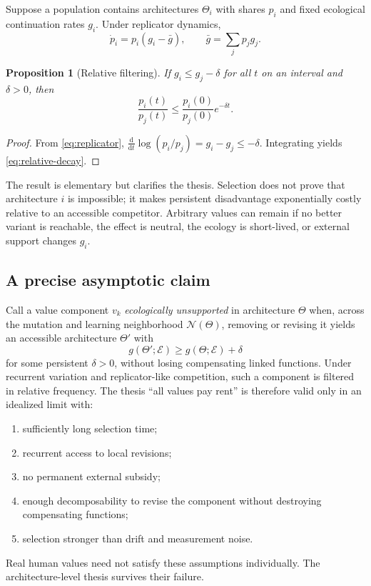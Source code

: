 \documentclass[11pt]{article}
\newtheorem{proposition}{Proposition}
\newcommand{\dd}{\mathrm{d}}
\begin{document}
Suppose a population contains architectures $\Theta_i$ with shares $p_i$ and fixed ecological continuation rates $g_i$. Under replicator dynamics,
\begin{equation}
\dot p_i=p_i(g_i-\bar g),
\qquad
\bar g=\sum_jp_jg_j.
\label{eq:replicator}
\end{equation}

\begin{proposition}[Relative filtering]
If $g_i\le g_j-\delta$ for all $t$ on an interval and $\delta>0$, then
\begin{equation}
\frac{p_i(t)}{p_j(t)}
\le
\frac{p_i(0)}{p_j(0)}e^{-\delta t}.
\label{eq:relative-decay}
\end{equation}
\end{proposition}

\begin{proof}
From \eqref{eq:replicator},
$\frac{\dd}{\dd t}\log(p_i/p_j)=g_i-g_j\le-\delta$.
Integrating yields \eqref{eq:relative-decay}.
\end{proof}

The result is elementary but clarifies the thesis. Selection does not prove that architecture $i$ is impossible; it makes persistent disadvantage exponentially costly relative to an accessible competitor. Arbitrary values can remain if no better variant is reachable, the effect is neutral, the ecology is short-lived, or external support changes $g_i$.

\subsection{A precise asymptotic claim}

Call a value component $v_k$ \emph{ecologically unsupported} in architecture $\Theta$ when, across the mutation and learning neighborhood $\mathcal N(\Theta)$, removing or revising it yields an accessible architecture $\Theta'$ with
\begin{equation}
g(\Theta';\mathcal E)\ge g(\Theta;\mathcal E)+\delta
\end{equation}
for some persistent $\delta>0$, without losing compensating linked functions. Under recurrent variation and replicator-like competition, such a component is filtered in relative frequency. The thesis ``all values pay rent'' is therefore valid only in an idealized limit with:
\begin{enumerate}[label=(A\arabic*)]
\item sufficiently long selection time;
\item recurrent access to local revisions;
\item no permanent external subsidy;
\item enough decomposability to revise the component without destroying compensating functions;
\item selection stronger than drift and measurement noise.
\end{enumerate}
Real human values need not satisfy these assumptions individually. The architecture-level thesis survives their failure.
\end{document}
